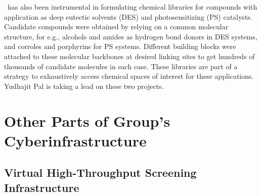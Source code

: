 \chemlg\ has also been instrumental in formulating chemical libraries for compounds with application as deep eutectic solvents (DES) and photosensitizing (PS) catalysts. Candidate compounds were obtained by relying on a common molecular structure, for e.g., alcohols and amides as hydrogen bond donors in DES systems, and corroles and porphyrins for PS systems. Different building blocks were attached to these molecular backbones at desired linking sites to get hundreds of thousands of candidate molecules in each case. These libraries are part of a strategy to exhaustively access chemical spaces of interest for these applications. Yudhajit Pal is taking a lead on these two projects.

\section{Other Parts of Group's Cyberinfrastructure}

\subsection{Virtual High-Throughput Screening Infrastructure}
\label{subsec:chemhtps}

